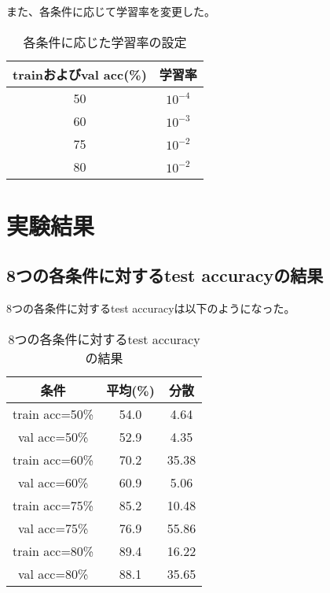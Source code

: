 \documentclass[12pt]{article}
\begin{document}
また、各条件に応じて学習率を変更した。

\begin{table}[H]
    \centering
    \caption{各条件に応じた学習率の設定}
    \begin{tabular}{c|c}
    trainおよびval acc(\%) & 学習率  \\ \hline
    50                  & $10^{-4}$ \\ \hline
    60                  & $10^{-3}$ \\ \hline
    75                  & $10^{-2}$ \\ \hline
    80                  & $10^{-2}$ \\ 
    \end{tabular}
    \end{table}

\section{実験結果}

\subsection{8つの各条件に対するtest accuracyの結果}

8つの各条件に対するtest accuracyは以下のようになった。

\begin{table}[H]
    
\centering
\caption{8つの各条件に対するtest accuracyの結果}
\begin{tabular}{c|c|c}
条件           & 平均(\%) & 分散    \\ \hline
train acc=50\% & 54.0   & 4.64  \\ \hline
val acc=50\%   & 52.9   & 4.35  \\ \hline
train acc=60\% & 70.2   & 35.38 \\ \hline
val acc=60\%   & 60.9   & 5.06  \\ \hline
train acc=75\% & 85.2   & 10.48 \\ \hline
val acc=75\%   & 76.9   & 55.86 \\ \hline
train acc=80\% & 89.4   & 16.22 \\ \hline
val acc=80\%   & 88.1   & 35.65 \\
\end{tabular}
\end{table}
\end{document}
